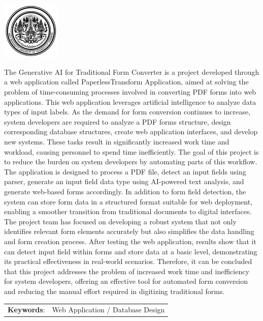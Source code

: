 \documentclass[12pt,oneside,openright,a4paper]{cpe-english-project}
\begin{document}
\pdfstringdefDisableCommands{\let\MakeUppercase\relax}
\begin{center}
  \includegraphics[width=2.8cm]{logo02.jpg}
\end{center}
\vspace*{-1cm}

\maketitlepage
\makesignaturepage 

\abstract

\setlength{\parindent}{15pt} The Generative AI for Traditional Form Converter is a project developed through a web application called PaperlessTransform Application, aimed at solving the problem of time-consuming processes involved in converting PDF forms into web applications. This web application leverages artificial intelligence to analyze data types of input labels. As the demand for form conversion continues to increase, system developers are required to analyze a PDF forms structure, design corresponding database structures, create web application interfaces, and develop new systems. These tasks result in significantly increased work time and workload, causing personnel to spend time inefficiently. The goal of this project is to reduce the burden on system developers by automating parts of this workflow. The application is designed to process a PDF file, detect an input fields using parser,  generate an input field data type using AI-powered text analysis, and generate web-based forms accordingly. In addition to form field detection, the system can store form data in a structured format suitable for web deployment, enabling a smoother transition from traditional documents to digital interfaces. The project team has focused on developing a robust system that not only identifies relevant form elements accurately but also simplifies the data handling and form creation process. After testing the web application, results show that it can detect input field within forms and store data at a basic level, demonstrating its practical effectiveness in real-world scenarios. Therefore, it can be concluded that this project addresses the problem of increased work time and inefficiency for system developers, offering an effective tool for automated form conversion and reducing the manual effort required in digitizing traditional forms.
\begin{flushleft}
\begin{tabular*}{\textwidth}{@{}lp{}}
\textbf{Keywords}: & Web Application / Database Design

\end{tabular*}
\end{flushleft}
\endabstract
\end{document}

